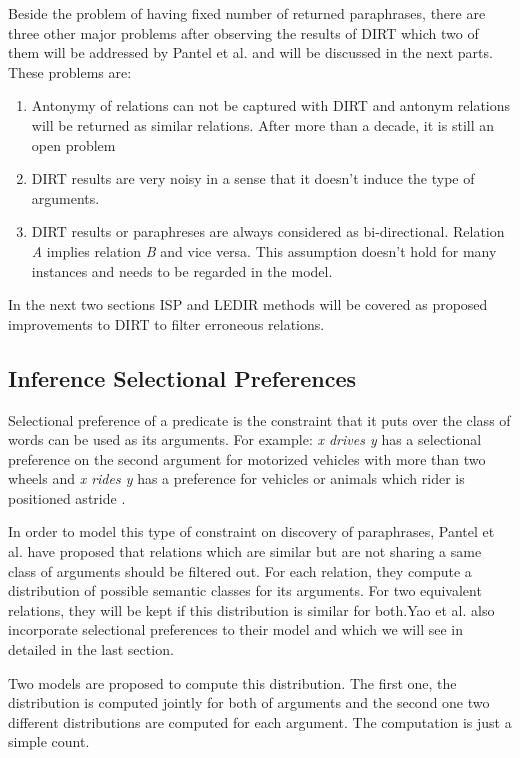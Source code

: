 \documentclass[12pt]{report}
\begin{document}
  Beside the problem of having fixed number of returned paraphrases, there are three other major 
  problems after observing the results of DIRT which two of them will be addressed by Pantel et al. and
  will be discussed in the next parts. These problems are:
  
  \begin{enumerate}
    \item Antonymy of relations can not be captured with DIRT and antonym relations will be returned as similar relations. After more than
    a decade, it is still an open problem
    \item DIRT results are very noisy in a sense that it doesn't induce the type of arguments.
    \item DIRT results or paraphreses are always considered as bi-directional. Relation \emph{A} implies relation \emph{B} and vice versa.
    This assumption doesn't hold for many instances and needs to be regarded in the model.
  \end{enumerate}
  
In the next two sections ISP and LEDIR methods will be covered as proposed improvements to DIRT to filter erroneous relations.
   

\subsection{Inference Selectional Preferences}
\label{ch:sel-pref} 

Selectional preference of a predicate is the constraint that it puts over the class of words can be used as its arguments.
For example: \emph{x drives y} has a selectional preference on the second argument for motorized 
vehicles with more than two wheels and \emph {x rides y}
has a preference for vehicles or animals which rider is positioned astride \cite{Mechura2008} .

In order to model this type of constraint on discovery of paraphrases, Pantel et al. \cite{Pantel2007} have proposed that
relations which are similar but are not sharing a same class of arguments should be filtered out. For each relation, 
they compute a distribution of possible semantic classes for its arguments. For two equivalent relations, they will be kept
if this distribution is similar for both.Yao et al. \cite{Yao2011} also incorporate selectional preferences to their model and which we
will see in detailed in the last section.

Two models are proposed to compute this distribution. The first one, the distribution is computed jointly for both of arguments
and the second one two different distributions are computed for each argument. The computation is just a simple count.
\end{document}
